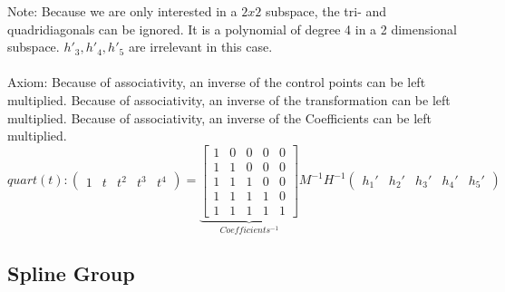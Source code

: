 \documentclass[a4paper,landscape]{report}
\begin{document}
Note: Because we are only interested in a $2x2$ subspace, the tri- and quadridiagonals can be ignored. It is a polynomial of degree 4 in a 2 dimensional subspace. $h'_{3},h'_{4},h'_{5}$ are irrelevant in this case.\\\\
Axiom: Because of associativity, an inverse of the control points can be left multiplied. Because of associativity, an inverse of the transformation can be left multiplied. Because of associativity, an inverse of the Coefficients can be left multiplied.
\begin{equation}
quart(t):
\begin{pmatrix}
1 & t & t^2 & t^3 & t^4
\end{pmatrix}
=
\underbrace{\begin{bmatrix}
1 & 0 & 0 & 0 & 0\\
1 & 1 & 0 & 0 & 0\\
1 & 1 &1 & 0 & 0\\
1 & 1 & 1 & 1 & 0\\
1 & 1 & 1 & 1 & 1
\end{bmatrix}}_{Coefficients^{-1}}
M^{-1}H^{-1}
\begin{pmatrix}
h_{1}' & h_{2}' & h_{3}' & h_{4}' & h_{5}'
\end{pmatrix}
\end{equation}

\iffalse
\subsection{Number of Variables}
Axiom: Within the bounds $[a,b]$ a combination of multiple $splines$ can occur. They are independent, $iff$ for all vectors there is a sum $g' +h'$\\\\
\begin{equation}
sum(t):
\begin{bmatrix}
1 & t & t^2\\
1 & u & u^2
\end{bmatrix}
\underbrace{CMH}_{}
=
\begin{pmatrix}
g_{1}' & g_{2}' & g_{3}'\\
h_{1}' & h_{2}' & h_{3}'
\end{pmatrix}
\end{equation}
Theorem: They are harmonic, hence there is a non-sparse separation.
\fi

\subsection{Spline Group}
\end{document}
